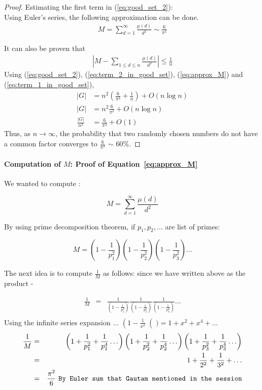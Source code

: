 \begin{proof}
Estimating the first term in (\ref{eq:good_set_2}):\\
Using Euler's series, the following approximation can be done.
\begin{align}
M = \sum_{d=1}^{\infty} \frac{\mu(d)}{d^2} \sim \frac{6}{\pi^2} \label{eq:approx_M}
\end{align} 

It can also be proven that
\begin{align}
|M-\sum_{1 \le d \le n} \frac{\mu(d)}{d^2}| \le \frac{1}{n}\label{eq:term_1_in_good_set}
\end{align}
Using (\ref{eq:good_set_2}), (\ref{eq:term_2_in_good_set}), (\ref{eq:approx_M}) and (\ref{eq:term_1_in_good_set}),
\begin{align*}
|G| &= n^2 (\frac{6}{\pi^2} + \frac{1}{n})+ O(n \log{n})\\
|G| &= n^2 \frac{6}{\pi^2} + O(n \log{n})\\
\frac{|G|}{n^2}&=\frac{6}{\pi^2} + O(1)
\end{align*}
Thus, as $n\rightarrow \infty$, the probability that two randomly chosen numbers do not have a common factor converges to $\frac{6}{\pi^2}$ $\sim$ $60\%$.
\end{proof}

\paragraph{Computation of $M$: Proof of Equation~\ref{eq:approx_M}}
We wanted to compute :

\[ M = \sum_{d=1}^\infty \frac{\mu(d)}{d^2} \]

By using prime decomposition theorem, if $p_1,p_2, \ldots $ are list of primes:

\[ M = \left( 1- \frac{1}{p_1^2} \right) \left( 1- \frac{1}{p_2^2} \right)  \left( 1- \frac{1}{p_3^2} \right)  \ldots \]

The next idea is to compute $\frac{1}{M}$ as follows: since we have written above as the product -

\begin{eqnarray*}
\frac{1}{M} & = & \frac{1}{\left( 1- \frac{1}{p_1^2} \right) }  \frac{1}{\left( 1- \frac{1}{p_2^2} \right) }  \frac{1}{\left( 1- \frac{1}{p_3^2} \right) } \ldots \\
\end{eqnarray*}
Using the infinite series expansion ... $\left(1-\frac{1}{x^2}\right() = 1+x^2+x^4+\ldots$
\begin{eqnarray*}
\frac{1}{M} & = & \left( 1+\frac{1}{p_1^2} + \frac{1}{p_1^4} \ldots \right)
\left( 1+\frac{1}{p_2^2} + \frac{1}{p_2^4} \ldots \right)
\left( 1+\frac{1}{p_3^2} + \frac{1}{p_3^4} \ldots \right) \\
& = & 1+\frac{1}{2^2}+\frac{1}{3^2}+ \ldots \\
& = & \frac{\pi^2}{6} \textrm{   {\tt By Euler sum that Gautam mentioned in the session}}
\end{eqnarray*}

